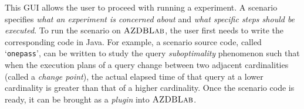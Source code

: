 \documentclass{vldb}
\def\azdb{\hbox{\sc AZDBLab}}
\begin{document}
This GUI allows the user to proceed with running a  \hbox{experiment}. 
A scenario specifies {\em what an \hbox{experiment} is \hbox{concerned} about} and {\em what specific steps should be executed}. 
To run the scenario on $\azdb$, the user first needs to write the corresponding code in Java. 
For example, a \hbox{scenario} source code, called `{\tt onepass}', can be written to study the query \hbox{{\em suboptimality}} \hbox{phenomenon} such that when the \hbox{execution} plans of a query change between two adjacent \hbox{cardinalities} (called a {\em change point}), the actual elapsed time of that query at a lower \hbox{cardinality} is greater than that of a higher \hbox{cardinality}. 
Once the \hbox{scenario} code is ready, it can be brought as a {\em plugin} into $\azdb$. 


\end{document}
